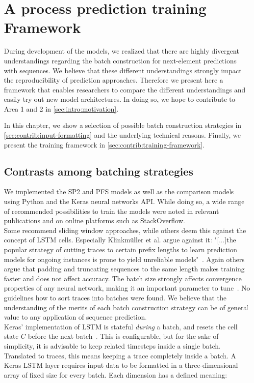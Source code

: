\chapter{A process prediction training Framework}\label{chap:training-framework}
During development of the models, we realized that there are highly divergent understandings regarding the batch construction for next-element predictions with sequences. We believe that these different understandings strongly impact the reproducibility of prediction approaches. Therefore we present here a framework that enables researchers to compare the different understandings and easily try out new model architectures. In doing so, we hope to contribute to Area 1 and 2 in \autoref{sec:intro:motivation}.

In this chapter, we show a selection of possible batch construction strategies in \autoref{sec:contrib:input-formatting} and the underlying technical reasons. Finally, we present the training framework in \autoref{sec:contrib:training-framework}.

\section{Contrasts among batching strategies}\label{sec:contrib:input-formatting}
We implemented the SP2 and PFS models as well as the comparison models using Python and the Keras neural networks API. While doing so, a wide range of recommended possibilities to train the models were noted in relevant publications and on online platforms such as StackOverflow.\\

Some recommend sliding window approaches, while others deem this against the concept of LSTM cells. Especially Klinkmüller et al. argue against it: "[...]the popular strategy of cutting traces to certain prefix lengths to learn prediction models for ongoing instances is prone to yield unreliable models"~\cite{klinkmuller2018reliablemonitoring}. Again others argue that padding and truncating sequences to the same length makes training faster and does not affect accuracy. The batch size strongly affects convergence properties of any neural network, making it an important parameter to tune~\cite{keskar2016large}. No guidelines how to sort traces into batches were found. We believe that the understanding of the merits of each batch construction strategy can be of general value to any application of sequence prediction.\\

Keras' implementation of LSTM is stateful \textit{during} a batch, and resets the cell state $C$ before the next batch~\cite{web:keras}. This is configurable, but for the sake of simplicity, it is advisable to keep related timesteps inside a single batch. Translated to traces, this means keeping a trace completely inside a batch. A Keras LSTM layer requires input data to be formatted in a three-dimensional array of fixed size for every batch. Each dimension has a defined meaning:

